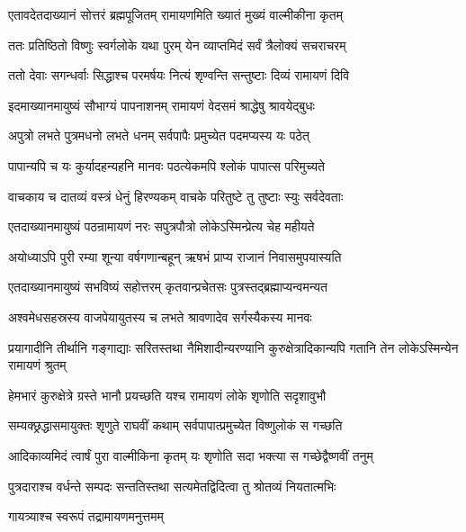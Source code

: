 
\twolineshloka
{एतावदेतदाख्यानं सोत्तरं ब्रह्मपूजितम्}
{रामायणमिति ख्यातं मुख्यं वाल्मीकीना कृतम्} %

\twolineshloka
{ततः प्रतिष्ठितो विष्णुः स्वर्गलोके यथा पुरम्}
{येन व्याप्तमिदं सर्वं त्रैलोक्यं सचराचरम्} %

\twolineshloka
{ततो देवाः सगन्धर्वाः सिद्धाश्च परमर्षयः}
{नित्यं शृण्वन्ति सन्तुष्टाः दिव्यं रामायणं दिवि} %

\twolineshloka
{इदमाख्यानमायुष्यं सौभाग्यं पापनाशनम्}
{रामायणं वेदसमं श्राद्धेषु श्रावयेद्बुधः} %

\twolineshloka
{अपुत्रो लभते पुत्रमधनो लभते धनम्}
{सर्वपापैः प्रमुच्येत पदमप्यस्य यः पठेत्} %

\twolineshloka
{पापान्यपि च यः कुर्यादहन्यहनि मानवः}
{पठत्येकमपि श्लोकं पापात्स परिमुच्यते} %

\twolineshloka
{वाचकाय च दातव्यं वस्त्रं धेनुं हिरण्यकम्}
{वाचके परितुष्टे तु तुष्टाः स्युः सर्वदेवताः} %

\twolineshloka
{एतदाख्यानमायुष्यं पठन्रामायणं नरः}
{सपुत्रपौत्रो लोकेऽस्मिन्प्रेत्य चेह महीयते} %

\twolineshloka
{अयोध्याऽपि पुरी रम्या शून्या वर्षगणान्बहून्}
{ऋषभं प्राप्य राजानं निवासमुपयास्यति} %

\twolineshloka
{एतदाख्यानमायुष्यं सभविष्यं सहोत्तरम्}
{कृतवान्प्रचेतसः पुत्रस्तद्ब्रह्माप्यन्वमन्यत} %

\twolineshloka
{अश्वमेधसहस्रस्य वाजपेयायुतस्य च}
{लभते श्रावणादेव सर्गस्यैकस्य मानवः} %

\threelineshloka
{प्रयागादीनि तीर्थानि गङ्गाद्याः सरितस्तथा}
{नैमिशादीन्यरण्यानि कुरुक्षेत्रादिकान्यपि}
{गतानि तेन लोकेऽस्मिन्येन रामायणं श्रुतम्} %

\twolineshloka
{हेमभारं कुरुक्षेत्रे ग्रस्ते भानौ प्रयच्छति}
{यश्च रामायणं लोके शृणोति सदृशावुभौ} %

\twolineshloka
{सम्यक्छ्रद्धासमायुक्तः शृणुते राघवीं कथाम्}
{सर्वपापात्प्रमुच्येत विष्णुलोकं स गच्छति} %

\twolineshloka
{आदिकाव्यमिदं त्वार्षं पुरा वाल्मीकिना कृतम्}
{यः शृणोति सदा भक्त्या स गच्छेद्वैष्णवीं तनुम्} %

\twolineshloka
{पुत्रदाराश्च वर्धन्ते सम्पदः सन्ततिस्तथा}
{सत्यमेतद्विदित्वा तु श्रोतव्यं नियतात्मभिः} %

\onelineshloka
{गायत्र्याश्च स्वरूपं तद्रामायणमनुत्तमम्} %

